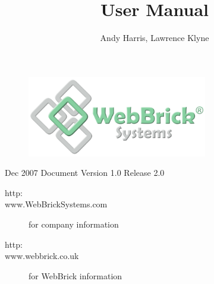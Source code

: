 \documentclass[a4paper,12pt]{article}
\title{\sf{WebBrick Gateway}\linebreak \linebreak User Manual}
\author{Andy Harris, Lawrence Klyne}
\begin{document}
\maketitle

\begin{figure}[H]
\centering
\includegraphics[width=0.7\textwidth]{../../Images/WebBrickSystems.png}
\end{figure}


\begin{description}
\item[Dec 2007 Document Version 1.0 Release 2.0]
\end{description}

\begin{description}
\item[http:\\www.WebBrickSystems.com] for company information
\item[http:\\www.webbrick.co.uk] for WebBrick information
\end{description}

\pagebreak

\tableofcontents

\pagebreak


\end{document}
